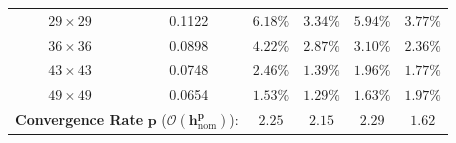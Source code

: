 \documentclass[VANCOUVER,Times1COL]{WileyNJD-v5}
\begin{document}
\begin{table}[!t]
{\begin{tabular}{cccccc}
            $29 \times 29$                                                                                    & 0.1122                                    & $6.18\%$                                          & $\mathbf{3.34\%}$                        & $5.94\%$          & $\mathbf{3.77\%}$  \\
            $36 \times 36$                                                                                    & 0.0898                                    & $4.22\%$                                          & $\mathbf{2.87\%}$                        & $3.10\%$          & $\mathbf{2.36\%}$  \\
            $43 \times 43$                                                                                    & 0.0748                                    & $2.46\%$                                          & $\mathbf{1.39\%}$                        & $1.96\%$          & $\mathbf{1.77\%}$  \\
            $49 \times 49$                                                                                    & 0.0654                                    & $1.53\%$                                          & $\mathbf{1.29\%}$                        & $\mathbf{1.63\%}$ & $1.97\%$           \\
            \midrule
            \multicolumn{2}{c}{\textbf{Convergence Rate} $\boldsymbol{p}$ ($\boldsymbol{\mathcal{O}(h_{\mathrm{nom}}^p)}$):} & $\mathbf{2.25}$                           & $\mathbf{2.15}$                                   & $\mathbf{2.29}$                          & $\mathbf{1.62}$                        \\
            \bottomrule
        \end{tabular}
    }
\end{table}
\end{document}
